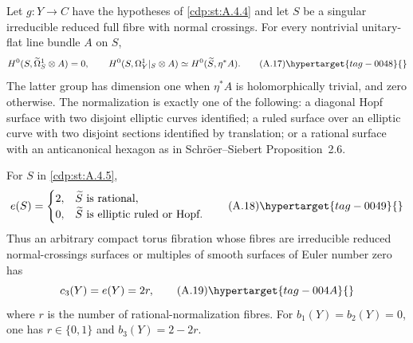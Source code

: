 \begin{proposition}\hypertarget{tag-01AU}{}\label{cdp:st:A.4.5}

Let $g:Y\to C$ have the hypotheses of \ref{cdp:st:A.4.4} and let $S$ be a singular irreducible reduced full fibre with normal crossings. For every nontrivial unitary-flat line bundle $A$ on $S$,
\[
H^0(S,\widetilde\Omega_S^1\otimes A)=0,
\qquad
H^0(S,\Omega_Y^1|_S\otimes A)
 \simeq H^0(\widetilde S,\eta^*A).
\tag{A.17}\hypertarget{tag-0048}{}\label{cdp:eq:A.17}
\]
The latter group has dimension one when $\eta^*A$ is holomorphically trivial, and zero otherwise. The normalization is exactly one of the following: a diagonal Hopf surface with two disjoint elliptic curves identified; a ruled surface over an elliptic curve with two disjoint sections identified by translation; or a rational surface with an anticanonical hexagon as in Schr\"oer--Siebert Proposition~2.6.
\end{proposition}

\begin{proposition}\hypertarget{tag-01AV}{}\label{cdp:st:A.4.6}

For $S$ in \ref{cdp:st:A.4.5},
\[
e(S)=\begin{cases}
2,&\widetilde S\text{ is rational},\\
0,&\widetilde S\text{ is elliptic ruled or Hopf}.
\end{cases}
\tag{A.18}\hypertarget{tag-0049}{}\label{cdp:eq:A.18}
\]
Thus an arbitrary compact torus fibration whose fibres are irreducible reduced normal-crossings surfaces or multiples of smooth surfaces of Euler number zero has
\[
c_3(Y)=e(Y)=2r,
\tag{A.19}\hypertarget{tag-004A}{}\label{cdp:eq:A.19}
\]
where $r$ is the number of rational-normalization fibres. For $b_1(Y)=b_2(Y)=0$, one has $r\in\{0,1\}$ and $b_3(Y)=2-2r$.
\end{proposition}

